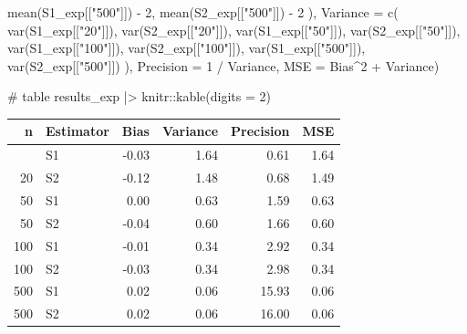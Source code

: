 \documentclass[
]{article}
\newenvironment{Shaded}{\begin{snugshade}}{\end{snugshade}}
\newcommand{\AttributeTok}[1]{\textcolor[rgb]{0.40,0.45,0.13}{#1}}
\newcommand{\CommentTok}[1]{\textcolor[rgb]{0.37,0.37,0.37}{#1}}
\newcommand{\DecValTok}[1]{\textcolor[rgb]{0.68,0.00,0.00}{#1}}
\newcommand{\FunctionTok}[1]{\textcolor[rgb]{0.28,0.35,0.67}{#1}}
\newcommand{\NormalTok}[1]{\textcolor[rgb]{0.00,0.23,0.31}{#1}}
\newcommand{\SpecialCharTok}[1]{\textcolor[rgb]{0.37,0.37,0.37}{#1}}
\newcommand{\StringTok}[1]{\textcolor[rgb]{0.13,0.47,0.30}{#1}}
\begin{document}
\begin{Shaded}
\begin{Highlighting}[numbers=left,,]
    \FunctionTok{mean}\NormalTok{(S1\_exp[[}\StringTok{"500"}\NormalTok{]]) }\SpecialCharTok{{-}} \DecValTok{2}\NormalTok{, }\FunctionTok{mean}\NormalTok{(S2\_exp[[}\StringTok{"500"}\NormalTok{]]) }\SpecialCharTok{{-}} \DecValTok{2}
\NormalTok{  ),}
  \AttributeTok{Variance =} \FunctionTok{c}\NormalTok{(}
    \FunctionTok{var}\NormalTok{(S1\_exp[[}\StringTok{"20"}\NormalTok{]]),  }\FunctionTok{var}\NormalTok{(S2\_exp[[}\StringTok{"20"}\NormalTok{]]),}
    \FunctionTok{var}\NormalTok{(S1\_exp[[}\StringTok{"50"}\NormalTok{]]),  }\FunctionTok{var}\NormalTok{(S2\_exp[[}\StringTok{"50"}\NormalTok{]]),}
    \FunctionTok{var}\NormalTok{(S1\_exp[[}\StringTok{"100"}\NormalTok{]]), }\FunctionTok{var}\NormalTok{(S2\_exp[[}\StringTok{"100"}\NormalTok{]]),}
    \FunctionTok{var}\NormalTok{(S1\_exp[[}\StringTok{"500"}\NormalTok{]]), }\FunctionTok{var}\NormalTok{(S2\_exp[[}\StringTok{"500"}\NormalTok{]])}
\NormalTok{  ),}
  \AttributeTok{Precision =} \DecValTok{1} \SpecialCharTok{/}\NormalTok{ Variance,}
  \AttributeTok{MSE =}\NormalTok{ Bias}\SpecialCharTok{\^{}}\DecValTok{2} \SpecialCharTok{+}\NormalTok{ Variance)}

\CommentTok{\# table}
\NormalTok{results\_exp }\SpecialCharTok{|\textgreater{}}\NormalTok{ knitr}\SpecialCharTok{::}\FunctionTok{kable}\NormalTok{(}\AttributeTok{digits =} \DecValTok{2}\NormalTok{)}
\end{Highlighting}
\end{Shaded}

\begin{longtable}[]{@{}rlrrrr@{}}
\toprule\noalign{}
n & Estimator & Bias & Variance & Precision & MSE \\
\midrule\noalign{}
\endhead
\bottomrule\noalign{}
\endlastfoot
20 & S1 & -0.03 & 1.64 & 0.61 & 1.64 \\
20 & S2 & -0.12 & 1.48 & 0.68 & 1.49 \\
50 & S1 & 0.00 & 0.63 & 1.59 & 0.63 \\
50 & S2 & -0.04 & 0.60 & 1.66 & 0.60 \\
100 & S1 & -0.01 & 0.34 & 2.92 & 0.34 \\
100 & S2 & -0.03 & 0.34 & 2.98 & 0.34 \\
500 & S1 & 0.02 & 0.06 & 15.93 & 0.06 \\
500 & S2 & 0.02 & 0.06 & 16.00 & 0.06 \\
\end{longtable}
\end{document}
